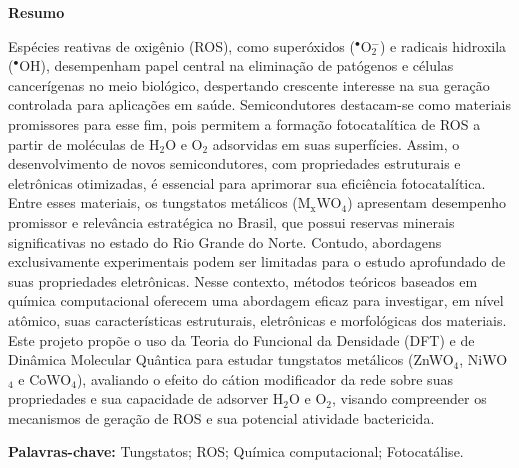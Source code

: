 \ifincluirresumo
\clearpage
\begin{center}
  \fontsize{14}{16}\selectfont\textbf{Resumo}
\end{center}
\begin{text}
    \noindent Espécies reativas de oxigênio (ROS), como superóxidos ($^\bullet$O$_{\text{2}}^{-}$) e radicais hidroxila ($^{\bullet}$OH), desempenham papel central na eliminação de patógenos e células cancerígenas no meio biológico, despertando crescente interesse na sua geração controlada para aplicações em saúde. Semicondutores destacam-se como materiais promissores para esse fim, pois permitem a formação fotocatalítica de ROS a partir de moléculas de H$_{\text{2}}$O e O$_{\text{2}}$ adsorvidas em suas superfícies. Assim, o desenvolvimento de novos semicondutores, com propriedades estruturais e eletrônicas otimizadas, é essencial para aprimorar sua eficiência fotocatalítica. Entre esses materiais, os tungstatos metálicos (M$_{\text{x}}$WO$_{\text{4}}$) apresentam desempenho promissor e relevância estratégica no Brasil, que possui reservas minerais significativas no estado do Rio Grande do Norte. Contudo, abordagens exclusivamente experimentais podem ser limitadas para o estudo aprofundado de suas propriedades eletrônicas. Nesse contexto, métodos teóricos baseados em química computacional oferecem uma abordagem eficaz para investigar, em nível atômico, suas características estruturais, eletrônicas e morfológicas dos materiais. Este projeto propõe o uso da Teoria do Funcional da Densidade (DFT) e de Dinâmica Molecular Quântica para estudar tungstatos metálicos (ZnWO$_{\text{4}}$, NiWO$_{\text{4}}$ e CoWO$_{\text{4}}$), avaliando o efeito do cátion modificador da rede sobre suas propriedades e sua capacidade de adsorver H$_{\text{2}}$O e O$_{\text{2}}$, visando compreender os mecanismos de geração de ROS e sua potencial atividade bactericida.
    
    \vspace{1em}    
    \noindent \textbf{Palavras-chave:} Tungstatos; ROS; Química computacional; Fotocatálise.
\end{text}
\fi

